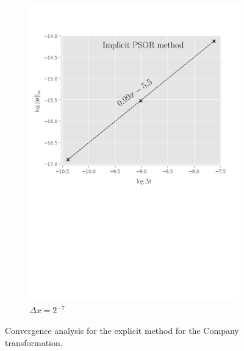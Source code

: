 \begin{figure}[tbp]
\begin{subfigure}{0.4\textwidth}
    \includegraphics[width=\textwidth]{chapters/chapter5/ConvergenceTimeImplicitLCP.pdf}
    \caption{$\Delta{t}=2^{-15},2^{-17},\dots,2^{-21}$}
    \caption*{$\Delta{x}=2^{-7}$}
    \label{fig:lcp:numericalresults:convergence_time_implicit}
  \end{subfigure}
  \caption{Convergence analysis for the explicit method for the Company transformation.}
  \label{fig:lcp:numericalresults:implicit_convergence_analysis}
\end{figure}

